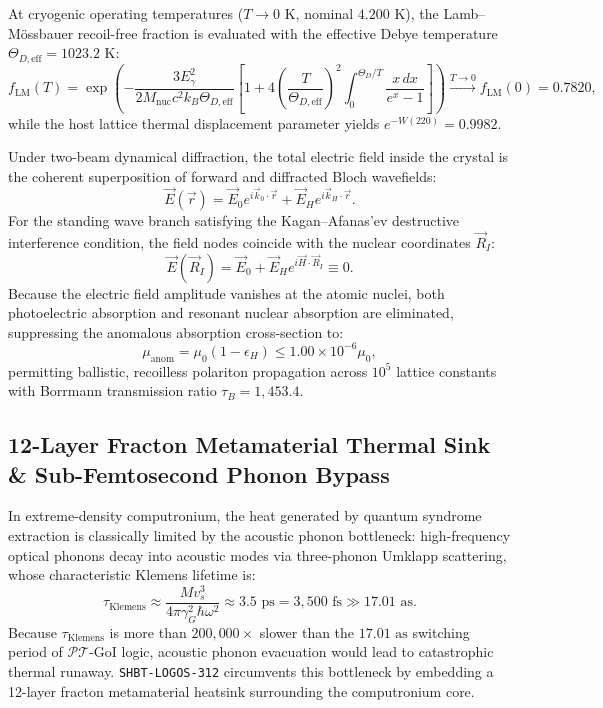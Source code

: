 \documentclass[11pt,onecolumn]{article}
\begin{document}
At cryogenic operating temperatures ($T \to 0\text{ K}$, nominal $4.200\text{ K}$), the Lamb--M\"ossbauer recoil-free fraction is evaluated with the effective Debye temperature $\Theta_{D,\text{eff}} = 1023.2\text{ K}$:
\begin{equation}
f_{\text{LM}}(T) = \exp\left( - \frac{3 E_\gamma^2}{2 M_{\text{nuc}} c^2 k_B \Theta_{D,\text{eff}}} \left[ 1 + 4\left(\frac{T}{\Theta_{D,\text{eff}}}\right)^2 \int_0^{\Theta_D/T} \frac{x\, dx}{e^x - 1} \right] \right) \xrightarrow{T \to 0} f_{\text{LM}}(0) = 0.7820,
\end{equation}
while the host lattice thermal displacement parameter yields $e^{-W(220)} = 0.9982$.

Under two-beam dynamical diffraction, the total electric field inside the crystal is the coherent superposition of forward and diffracted Bloch wavefields:
\begin{equation}
\vec{E}(\vec{r}) = \vec{E}_0 e^{i \vec{k}_0 \cdot \vec{r}} + \vec{E}_H e^{i \vec{k}_H \cdot \vec{r}}.
\end{equation}
For the standing wave branch satisfying the Kagan--Afanas'ev destructive interference condition, the field nodes coincide with the nuclear coordinates $\vec{R}_I$:
\begin{equation}
\vec{E}(\vec{R}_I) = \vec{E}_0 + \vec{E}_H e^{i \vec{H} \cdot \vec{R}_I} \equiv 0.
\label{eq:kagan_afanasev_nodal}
\end{equation}
Because the electric field amplitude vanishes at the atomic nuclei, both photoelectric absorption and resonant nuclear absorption are eliminated, suppressing the anomalous absorption cross-section to:
\begin{equation}
\mu_{\text{anom}} = \mu_0 (1 - \epsilon_H) \le 1.00 \times 10^{-6} \mu_0,
\end{equation}
permitting ballistic, recoilless polariton propagation across $10^5$ lattice constants with Borrmann transmission ratio $\tau_B = 1{,}453.4$.

\subsection{12-Layer Fracton Metamaterial Thermal Sink \& Sub-Femtosecond Phonon Bypass}
\label{sec:logos_fracton_thermal_bypass}

In extreme-density computronium, the heat generated by quantum syndrome extraction is classically limited by the acoustic phonon bottleneck: high-frequency optical phonons decay into acoustic modes via three-phonon Umklapp scattering, whose characteristic Klemens lifetime is:
\begin{equation}
\tau_{\text{Klemens}} \approx \frac{M v_s^3}{4\pi \gamma_G^2 \hbar \omega^2} \approx 3.5\text{ ps} = 3{,}500\text{ fs} \gg 17.01\text{ as}.
\label{eq:klemens_lifetime_bottleneck}
\end{equation}
Because $\tau_{\text{Klemens}}$ is more than $200{,}000\times$ slower than the $17.01\text{ as}$ switching period of $\mathcal{PT}$-GoI logic, acoustic phonon evacuation would lead to catastrophic thermal runaway. \texttt{SHBT-LOGOS-312} circumvents this bottleneck by embedding a 12-layer fracton metamaterial heatsink surrounding the computronium core.
\end{document}
